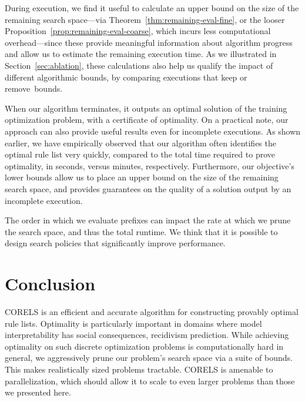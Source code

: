 \begin{arxiv}
During execution, we find it useful to calculate an upper bound on the
size of the remaining search space---\eg via Theorem~\ref{thm:remaining-eval-fine},
or the looser Proposition~\ref{prop:remaining-eval-coarse}, which incurs less
computational overhead---since these provide meaningful information about algorithm
progress and allow us to estimate the remaining execution time.
%
As we illustrated in Section~\ref{sec:ablation},
these calculations also help us qualify the impact of different algorithmic bounds,
\eg by comparing executions that keep or remove~bounds.

When our algorithm terminates, it outputs an optimal solution of the training optimization problem, with a certificate of optimality.
%
On a practical note, our approach can also provide useful results even for incomplete executions.
%
As shown earlier, we have empirically observed that our algorithm often identifies the optimal rule list
very quickly, compared to the total time required to prove optimality, \eg in seconds,
versus minutes, respectively.
%
Furthermore, our objective's lower bounds allow us to place an upper bound on the size of the remaining search space,
and provides guarantees on the quality of a solution output by an incomplete execution.

The order in which we evaluate prefixes can impact the rate at which we
prune the search space, and thus the total runtime. We think that it is possible to design search policies that significantly improve performance.

\end{arxiv}

\section{Conclusion}

\begin{kdd}
CORELS is an efficient and accurate algorithm for constructing provably optimal rule lists.
%
Optimality is particularly important in domains where model interpretability
has social consequences, \eg recidivism prediction.
%
While achieving optimality on such discrete optimization problems is
computationally hard in general, we aggressively prune our problem's search space
via a suite of bounds.
%
This makes realistically sized problems tractable.
%
CORELS is amenable to parallelization, which should allow it to scale to
even larger problems than those we presented here.
\end{kdd}

